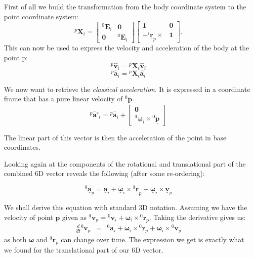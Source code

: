 \documentclass[a4paper]{article}
\newcommand{\Spa}[1]{\mathbf{\hat{#1}}}
\newcommand{\Nspa}[1]{\mathbf{\underline{#1}}}
\newcommand{\Vec}[1]{\mathbf{#1}}
\begin{document}
First of all we build the transformation from the body coordinate system to
the point coordinate system:
\begin{equation}
	{^p}\Vec{X}_i =
	\left[
	\begin{array}{cc}
		{^0}\Vec{E}_i & \Vec{0} \\
		\Vec{0} & {^0}\Vec{E}_i
	\end{array}
	\right]
	\left[
	\begin{array}{cc}
		\Vec{1} & \Vec{0} \\
		-{^i}\Nspa{r}_p \times & \Vec{1}
	\end{array}
	\right].
\end{equation}
This can now be used to express the velocity and acceleration of the body at
the point p:
\begin{equation}
	{^p}\Spa{v}_i = {^p}\Vec{X}_i \Spa{v}_i
\end{equation}
\begin{equation}
	{^p}\Spa{a}_i = {^p}\Vec{X}_i \Spa{a}_i
\end{equation}

We now want to retrieve the \emph{classical acceleration}. It is expressed in a
coordinate frame that has a pure linear velocity of ${^0}\Nspa{\dot{p}}$.
\begin{equation}
	{^p}\Spa{a}'_i = {^p}\Spa{a}_i + 
	\left[
	\begin{array}{c}
		\Vec{0}\\
		{^0}\Nspa{\omega}_i \times {^0}\Nspa{\dot{p}}
	\end{array}
	\right]
\end{equation}

The linear part of this vector is then the acceleration of the point in base
coordinates.

Looking again at the components of the rotational and translational part of
the combined 6D vector reveals the following (after some re-ordering):

\begin{equation}
	{}^0\Nspa{a}_p = \Nspa{a}_i +
	\Nspa{\dot{\omega}}_i
	\times
	{}^0\Nspa{r}_p
	+
	\Nspa{\omega}_i \times \Nspa{v}_p
	\label{}
\end{equation}

We shall derive this equation with standard 3D notation. Assuming we have the
velocity of point $\Vec{p}$ given as ${}^0\Vec{v}_p = {}^0\Vec{v}_i +
\Vec{\omega}_i \times {}^0\Vec{r}_p$. Taking the derivative gives us:
\begin{eqnarray}
	\frac{d}{dt} {}^0 \Vec{v}_p & = & {}^0 \Vec{a}_i + \Vec{\dot{\omega}}_i \times
	{}^0 \Vec{r}_p + \Vec{\omega}_i \times {}^0 \Vec{ v}_p
	\label{}
\end{eqnarray}
as both $\Vec{\omega}$ and ${}^0\Vec{r}_p$ can change over time. The
expression we get is exactly what we found for the translational part of our
6D vector.
\end{document}
